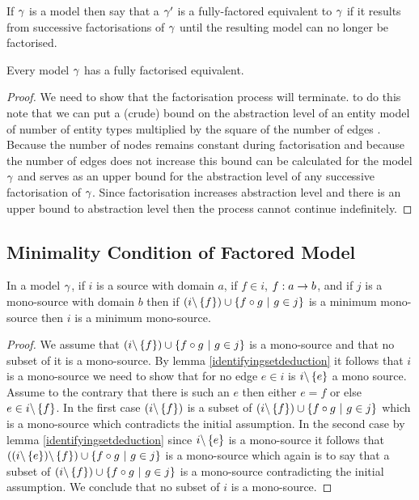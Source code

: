 \begin{definition}
If $\gamma$ is a model then say that a $\gamma'$ is a fully-factored 
equivalent to $\gamma$
if it results from successive factorisations of $\gamma$ until the resulting model can no longer be
factorised. 
\end{definition}

\begin{lemma}
Every model $\gamma$ has a fully factorised equivalent. 
\end{lemma}
\begin{proof}
We need to show that the factorisation process will terminate. 
to do this note that we can put a (crude) bound on the abstraction level of an entity model
of number of entity types multiplied by the square of the  number of edges
.  Because the number of nodes remains constant during
factorisation and because the number of edges does not increase this bound can be calculated
for the model $\gamma$ and serves as an upper bound for the abstraction level of 
any successive factorisation of $\gamma$. Since factorisation increases abstraction level
and there is an upper bound to abstraction level then the process cannot continue indefinitely. 
\end{proof}

\subsection{Minimality Condition of Factored Model}

\begin{lemma}
\label{identifyingfactorminimal}
In a model $\gamma$, if $i$ is a source with domain $a$,
if $f \in i$, $f: a \rightarrow b$, 
and if $j$ is a mono-source with domain $b$
then  if $(i \backslash \left\{f\right\}) \cup \left\{f \circ g \ \middle|\ g \in j\right\}$ is a minimum mono-source
then $i$ is a minimum mono-source.
\end{lemma}
\begin{proof}
We assume that $(i \backslash \left\{f\right\}) \cup \left\{f \circ g \ \middle|\ g \in j\right\}$ is a mono-source and that no subset of it is a mono-source.
By lemma \ref{identifyingsetdeduction} it follows that $i$ is a mono-source we need to show that
for no edge $e \in i$ is $i \backslash \left\{e\right\}$ a mono source. Assume to the contrary that there is such an $e$ then  either $e = f$ or else
$e \in i \backslash \left\{f\right\}$. In the first case $(i \backslash \left\{f\right\})$ is a subset of  $(i \backslash \left\{f\right\}) \cup \left\{f \circ g \ \middle|\ g \in j\right\}$ which is a mono-source which contradicts the initial assumption. In the second  case 
by lemma \ref{identifyingsetdeduction} since $i \backslash \left\{e\right\}$ is a mono-source it follows that
$((i \backslash \left\{e\right\})\backslash \left\{f\right\}) \cup \left\{f \circ g \ \middle|\ g \in j\right\}$ is a mono-source which again is to say that a subset
of $(i \backslash \left\{f\right\}) \cup \left\{f \circ g \ \middle|\ g \in j\right\}$ is a mono-source contradicting the initial assumption.
We conclude that no subset of $i$ is a mono-source.
\end{proof}

